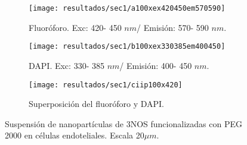\begin{figure}
\centering
\begin{subfigure}{\textwidth}
\centering
\texttt{[image: resultados/sec1/a100xex420450em570590]}\caption{Fluor\'oforo. Exc: 420- 450 $nm$/ Emisi\'on: 570- 590 $nm$.}\label{3namarillita}
\end{subfigure}
\begin{subfigure}{\textwidth}
\centering
\texttt{[image: resultados/sec1/b100xex330385em400450]}\caption{DAPI. Exc: 330- 385 $nm$/ Emisi\'on: 400- 450 $nm$.}\label{nuclios}
\end{subfigure}
\begin{subfigure}{\textwidth}
\centering
\texttt{[image: resultados/sec1/ciip100x420]}\caption{Superposici\'on del fluor\'oforo y DAPI.}\label{juntitos}
\end{subfigure}
\caption{Suspensi\'on de nanopart\'iculas de 3NOS funcionalizadas con PEG 2000 en c\'elulas endoteliales. Escala 20$\mu m$.}
\label{yacasicasi}
\end{figure}
